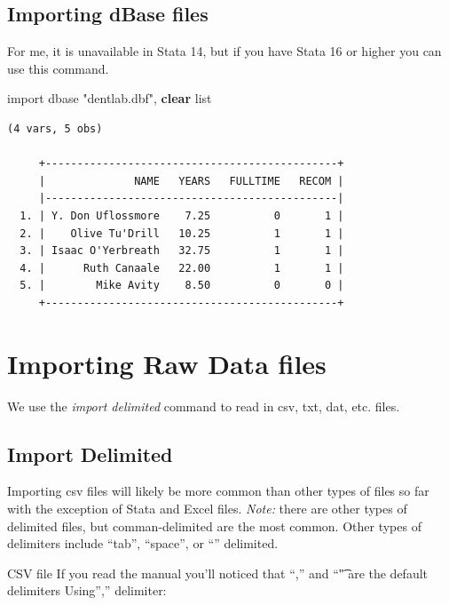 \documentclass[
]{book}
\newenvironment{Shaded}{\begin{snugshade}}{\end{snugshade}}
\newcommand{\KeywordTok}[1]{\textcolor[rgb]{0.13,0.29,0.53}{\textbf{#1}}}
\newcommand{\NormalTok}[1]{#1}
\newcommand{\OtherTok}[1]{\textcolor[rgb]{0.56,0.35,0.01}{#1}}
\newcommand{\StringTok}[1]{\textcolor[rgb]{0.31,0.60,0.02}{#1}}
\begin{document}
\subsection{Importing dBase files}\label{importing-dbase-files}

For me, it is unavailable in Stata 14, but if you have Stata 16 or higher you can use this command.

\begin{Shaded}
\begin{Highlighting}[]
\NormalTok{import dbase }\StringTok{"dentlab.dbf"}\NormalTok{, }\KeywordTok{clear}
\OtherTok{list}
\end{Highlighting}
\end{Shaded}

\begin{verbatim}
(4 vars, 5 obs)

     +----------------------------------------------+
     |              NAME   YEARS   FULLTIME   RECOM |
     |----------------------------------------------|
  1. | Y. Don Uflossmore    7.25          0       1 |
  2. |    Olive Tu'Drill   10.25          1       1 |
  3. | Isaac O'Yerbreath   32.75          1       1 |
  4. |      Ruth Canaale   22.00          1       1 |
  5. |        Mike Avity    8.50          0       0 |
     +----------------------------------------------+
\end{verbatim}

\section{Importing Raw Data files}\label{importing-raw-data-files}

We use the \emph{import delimited} command to read in csv, txt, dat, etc. files.

\subsection{Import Delimited}\label{import-delimited}

Importing csv files will likely be more common than other types of files so far with the exception of Stata and Excel files. \emph{Note:} there are other types of delimited files, but comman-delimited are the most common. Other types of delimiters include ``tab'', ``space'', or ``\textbar{}'' delimited.

CSV file
If you read the manual you'll noticed that ``,'' and ``\t" are the default delimiters
Using'','' delimiter:
\end{document}
